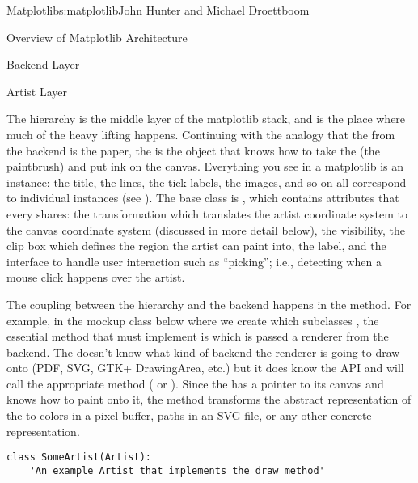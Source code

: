 \begin{aosachapter}{Matplotlib}{s:matplotlib}{John Hunter and Michael Droettboom}
\begin{aosasect1}{Overview of Matplotlib Architecture}
\begin{aosasect2}{Backend Layer}
\end{aosasect2}

\begin{aosasect2}{Artist Layer}

The  hierarchy is the middle layer of the matplotlib
stack, and is the place where much of the heavy lifting happens.
Continuing with the analogy that the  from the
backend is the paper, the  is the object that knows how
to take the  (the paintbrush) and put ink on the
canvas.  Everything you see in a matplotlib  is an
 instance: the title, the lines, the tick labels, the
images, and so on all correspond to individual  instances
(see ).  The base class is
, which contains attributes that every
 shares: the transformation which translates the artist
coordinate system to the canvas coordinate system (discussed in more
detail below), the visibility, the clip box which defines the region
the artist can paint into, the label, and the interface to handle user
interaction such as ``picking''; i.e., detecting when a mouse click
happens over the artist.



The coupling between the  hierarchy and the backend
happens in the  method.  For example, in the mockup class below
where we create  which subclasses , the
essential method that  must implement is 
which is passed a renderer from the backend.
The  doesn't know what kind of backend the renderer is going to
draw onto (PDF, SVG, GTK+ DrawingArea, etc.) but it does know the
 API and will call the appropriate method
( or ).  Since the  has
a pointer to its canvas and knows how to paint onto it, the 
method transforms the abstract representation of the  to
colors in a pixel buffer, paths in an SVG file, or any other
concrete representation.

\begin{verbatim}
class SomeArtist(Artist):
    'An example Artist that implements the draw method'


\end{verbatim}
\end{aosasect2}
\end{aosasect1}
\end{aosachapter}
